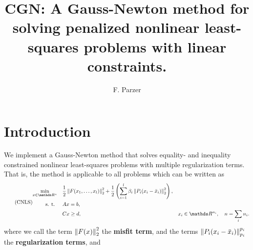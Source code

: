 \documentclass{article}
\title{CGN: A Gauss-Newton method for solving penalized nonlinear least-squares problems with linear constraints.}
\author{F. Parzer}
\numberwithin{equation}{section}
\theoremstyle{nonumberplain}
\begin{document}
\maketitle

\begin{abstract}

\end{abstract}



\section{Introduction}

We implement a Gauss-Newton method that solves equality- and inequality constrained nonlinear least-squares problems with multiple regularization terms. That is, the method is applicable to all problems which can be written as
\begin{equation}\tag{CNLS}\label{eq:cnls}
\begin{aligned}
\min_{x \in \R^n} \quad & \frac{1}{2}\norm{F(x_1,\ldots,x_l)}_2^2 + \frac{1}{2} \left( \sum_{i=1}^l \beta_i \norm{P_i(x_i-\bar x_i)}_2^2 \right),\\
\text{s. t. } \quad & Ax = b, \\
& C x \geq d,
& x_i \in \R^{n_i}, \quad n = \sum_i n_i.
\end{aligned}
\end{equation}
where we call the term $ \left\|F(x)\right\|_2^2$ the \textbf{misfit term}, and the terms $ \left\|P_i(x_i-\bar x_i)\right\|_{p_i}^{p_i}$ the \textbf{regularization terms}, and
\end{document}
